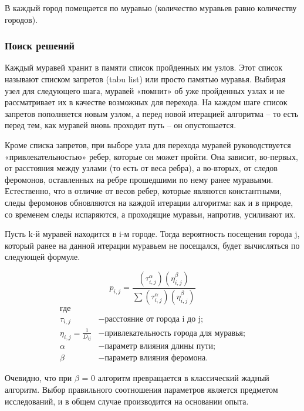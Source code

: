 \documentclass[a4paper,14pt]{report}
\begin{document}
В каждый город помещается по муравью (количество муравьев равно количеству городов).

\subsubsection*{Поиск решений}

Каждый муравей хранит в памяти список пройденных им узлов. Этот список называют списком запретов (tabu list) или просто памятью муравья. Выбирая узел для следующего шага, муравей «помнит» об уже пройденных узлах и не рассматривает их в качестве возможных для перехода. На каждом шаге список запретов пополняется новым узлом, а перед новой итерацией алгоритма – то есть перед тем, как муравей вновь проходит путь – он опустошается.

Кроме списка запретов, при выборе узла для перехода муравей руководствуется «привлекательностью» ребер, которые он может пройти. Она зависит, во-первых, от расстояния между узлами (то есть от веса ребра), а во-вторых, от следов феромонов, оставленных на ребре прошедшими по нему ранее муравьями. Естественно, что в отличие от весов ребер, которые являются константными, следы феромонов обновляются на каждой итерации алгоритма: как и в природе, со временем следы испаряются, а проходящие муравьи, напротив, усиливают их.

Пусть k-й муравей находится в i-м городе. Тогда вероятность посещения города j, который ранее на данной итерации муравьем не посещался, будет вычисляться по следующей формуле.

\begin{equation}\label{form:way}
 p_{i,j}={\frac {(\tau _{i,j}^{\alpha })(\eta _{i,j}^{\beta })}{\sum (\tau _{i,j}^{\alpha })(\eta _{i,j}^{\beta })}}
 \end{equation}
 \begin{align*}
    \text{где} \\
   \tau _{i,j} &- \text{расстояние от города i до j;} \\
    \eta _{i,j} = \frac{1}{D_{ij}} &- \text{привлекательность города для муравья;} \\
    \alpha &- \text{параметр влияния длины пути;} \\
    \beta &- \text{параметр влияния феромона.}
\end{align*}

Очевидно, что при $\beta$ = 0 алгоритм превращается в классический жадный алгоритм. Выбор правильного соотношения параметров является предметом исследований, и в общем случае производится на основании опыта.
\end{document}
